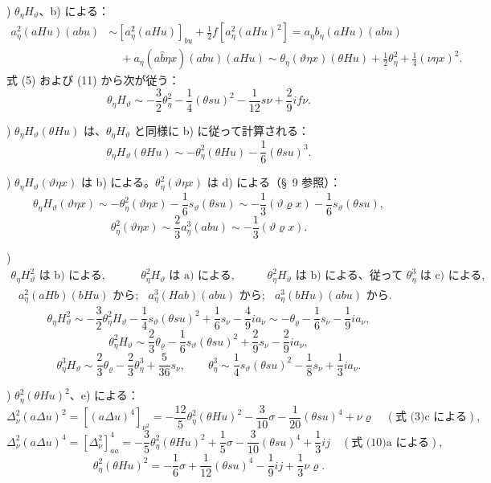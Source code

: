 \documentclass[11pt]{article}
\newcommand{\A}{\Delta}
\newcommand{\R}{\varrho}
\begin{document}
) $\theta_\eta H_\vartheta$、b) による：
\[
\begin{aligned}
a_\eta^2(aHu)(abu)&\sim [a_\eta^2(aHu)]_{bu}+\frac12 f[a_\eta^2(aHu)^2]
=a_\eta b_\eta(aHu)(abu)\\
&\quad+a_\eta(a\widehat{b}\eta x)(abu)(aHu)
\sim \theta_\eta(\vartheta\eta x)(\theta Hu)+\frac12\theta_\eta^2+\frac14(\nu\eta x)^2.
\end{aligned}
\]
式 (5) および (11) から次が従う：
\[
\theta_\eta H_\vartheta\sim -\frac32\theta_\eta^2-\frac14(\theta su)^2-\frac1{12}s\nu+\frac29if\nu.
\]

) $\theta_\eta H_\vartheta(\theta Hu)$ は、$\theta_\eta H_\vartheta$ と同様に b) に従って計算される：
\[
\theta_\eta H_\vartheta(\theta Hu)\sim-\theta_\eta^2(\theta Hu)-\frac16(\theta su)^3.
\]

) $\theta_\eta H_\vartheta(\vartheta\eta x)$ は b) による。$\theta_\eta^2(\vartheta\eta x)$ は d) による（\S\ 9 参照）：
\[
\theta_\eta H_\vartheta(\vartheta\eta x)\sim-\theta_\eta^2(\vartheta\eta x)-\frac16s_\vartheta(\theta su)
\sim-\frac13(\vartheta\R x)-\frac16s_\vartheta(\theta su),
\]
\[
\theta_\eta^2(\vartheta\eta x)\sim\frac23a_\eta^3(abu)\sim-\frac13(\vartheta\R x).
\]

)
\[
\begin{array}{ccc}
\theta_\eta H_\vartheta^2\text{ は b) による},&
\theta_\eta^2H_\vartheta\text{ は a) による},&
\theta_\eta^2H_\vartheta\text{ は b) による、従って }\theta_\eta^3\text{ は c) による},\\
\text{ }a_\eta^2(aHb)(bHu)\text{ から};&
\text{ }a_\eta^3(Hab)(abu)\text{ から};&
\text{ }a_\eta^3(bHu)(abu)\text{ から}.
\end{array}
\]
\[
\theta_\eta H_\vartheta^2\sim-\frac32\theta_\eta^2H_\vartheta-\frac14s_\vartheta(\theta su)^2+\frac16s_\nu-\frac49ia_\nu
\sim-\theta_\R-\frac16s_\nu-\frac19ia_\nu,
\]
\[
\theta_\eta^2H_\vartheta\sim\frac23\theta_\R-\frac16s_\vartheta(\theta su)^2+\frac29s_\nu-\frac29ia_\nu,
\]
\[
\theta_\eta^3H_\vartheta\sim\frac23\theta_\R-\frac23\theta_\eta^3+\frac5{36}s_\nu,
\qquad
\theta_\eta^3\sim\frac14s_\vartheta(\theta su)^2-\frac18s_\nu+\frac13ia_\nu.
\]

) $\theta_\eta^2(\theta Hu)^2$、e) による：
\[
\A_\nu^2(a\A u)^2=[(a\A u)^4]_{\nu^2}
=-\frac{12}{5}\theta_\eta^2(\theta Hu)^2-\frac3{10}\sigma-\frac1{20}(\theta su)^4+\nu\R
\quad(\text{式 (3)c による}),
\]
\[
\A_\nu^2(a\A u)^4=[\A_\nu^2]_{aa}^4=-\frac35\theta_\eta^2(\theta Hu)^2+\frac15\sigma-\frac3{10}(\theta su)^4+\frac13ij
\quad(\text{式 (10)a による}),
\]
\[
\theta_\eta^2(\theta Hu)^2=-\frac16\sigma+\frac1{12}(\theta su)^4-\frac19ij+\frac13\nu\R.
\]
\end{document}
